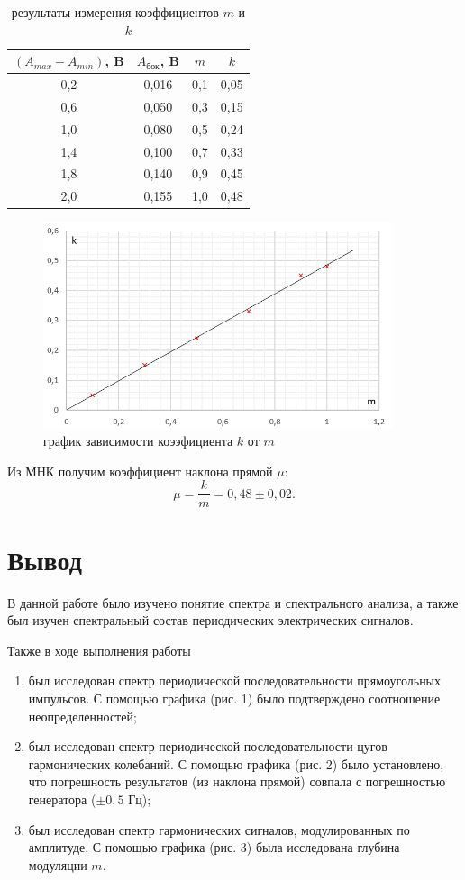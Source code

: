 \documentclass[a4paper]{article}
\theoremstyle{definition}
\theoremstyle{remark}
\begin{document}
\begin{table}[h!]
    \centering
    \begin{tabular}{|c|c|c|c|}
    \hline
    $(A_{max} - A_{min})$, B & $A_{\text{бок}}$, B      &  $m$   &   $k$   \\ \hline
    0,2 & 0,016 & 0,1 & 0,05 \\ \hline
    0,6 & 0,050 & 0,3 & 0,15 \\ \hline
    1,0 & 0,080 & 0,5 & 0,24 \\ \hline
    1,4 & 0,100 & 0,7 & 0,33 \\ \hline
    1,8 & 0,140 & 0,9 & 0,45 \\ \hline
    2,0 & 0,155 & 1,0 & 0,48 \\ \hline
    \end{tabular}
    \caption{результаты измерения коэффициентов $m$ и $k$}
    \end{table}

    \begin{figure}[t]
        \centering
        \includegraphics[width = 290pt]{image/graph3.png}
        \caption{график зависимости коээфициента $k$ от $m$}
    \end{figure}

\noindent Из МНК получим коэффициент наклона прямой $\mu$: $$\mu = \frac{k}{m} = 0,48 \pm 0,02.$$

\section{Вывод}

В данной работе было изучено понятие спектра и спектрального анализа, а также был изучен спектральный состав периодических электрических сигналов. 

\medskip

Также в ходе выполнения работы

\begin{enumerate}
    \item был исследован спектр периодической последовательности прямоугольных импульсов. С помощью графика (рис. 1) было подтверждено соотношение неопределенностей; 
    \item был исследован спектр периодической последовательности цугов гармонических колебаний. С помощью графика (рис. 2) было установлено, что погрешность результатов (из наклона прямой) совпала с погрешностью генератора ($\pm 0,5$ Гц);
    \item был исследован спектр гармонических сигналов, модулированных по амплитуде. С помощью графика (рис. 3) была исследована глубина модуляции $m$.
\end{enumerate}
\end{document}
